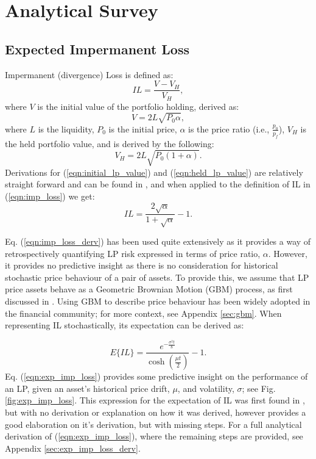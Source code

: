 \documentclass[journal,twocolumn,12pt]{ieeesyscoin}
\begin{document}
\section{Analytical Survey}

\subsection{Expected Impermanent Loss}
\label{sec:exp_impermanent_loss}

Impermanent (divergence) Loss is defined as:
\begin{equation}\label{eqn:imp_loss}
IL = \frac{V - V_{H}}{V_{H}},
\end{equation}
where $V$ is the initial value of the portfolio holding, derived as:
\begin{equation}\label{eqn:initial_lp_value}
V = 2L\sqrt{P_{0}\alpha},
\end{equation}
where $L$ is the liquidity, $P_{0}$ is the initial price, $\alpha$ is the price ratio (i.e., $\frac{p_{0}}{p_{f}}$), $V_{H}$ is the held portfolio value, and is derived by the following:
\begin{equation}\label{eqn:held_lp_value}
V_{H} = 2L\sqrt{P_{0} (1+\alpha)}.
\end{equation}
Derivations for (\ref{eqn:initial_lp_value}) and (\ref{eqn:held_lp_value}) are relatively straight forward and can be found in \cite{Aig21,Pet21}, and when applied to the definition of IL in (\ref{eqn:imp_loss}) we get:
\begin{equation}\label{eqn:imp_loss_derv}
IL = \frac{2\sqrt{\alpha}}{1+\sqrt{\alpha}} - 1.
\end{equation}

Eq. (\ref{eqn:imp_loss_derv}) has been used quite extensively \cite{Pin19a,Pin19b,Aig21,Pet21} as it provides a way of retrospectively quantifying LP risk expressed in terms of price ratio, $\alpha$. However, it provides no predictive insight as there is no consideration for historical stochastic price behaviour of a pair of assets. To provide this, we assume that LP price assets behave as a Geometric Brownian Motion (GBM) process, as first discussed in \cite{Gui21}. Using GBM to describe price behaviour has been widely adopted in the financial community; for more context, see Appendix \ref{sec:gbm}. When representing IL stochastically, its expectation can be derived as:

\begin{equation}\label{eqn:exp_imp_loss}
  E\{IL\} = \frac{e^{-\frac{\sigma^2 t}{8}}}{\cosh (\frac{\mu t}{2})} - 1.
\end{equation}
Eq. (\ref{eqn:exp_imp_loss}) provides some predictive insight on the performance of an LP, given an asset's historical price drift, $\mu$, and volatility, $\sigma$; see Fig. \ref{fig:exp_imp_loss}. This expression for the expectation of IL was first found in \cite{Gui21}, but with no derivation or explanation on how it was derived, however \cite{Dan22} provides a good elaboration on it's derivation, but with missing steps. For a full analytical derivation of (\ref{eqn:exp_imp_loss}), where the remaining steps are provided, see Appendix \ref{sec:exp_imp_loss_derv}.
\end{document}
